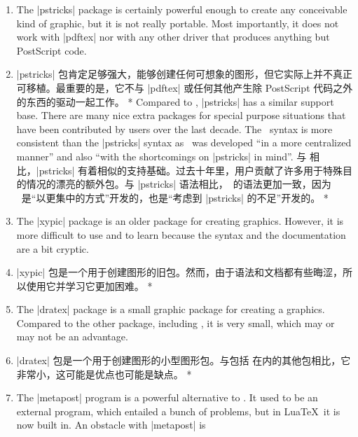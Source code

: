 \begin{paracol}{2}
\begin{enumerate}
        标准的 \LaTeX\ |{picture}| 环境允许你创建简单的图形，但是不太可能做更多。这肯定不是因为 \LaTeX 的设计者缺乏知识或想象力。反而，这是为了 |{picture}| 环境的可移植性而付出的代价：它可以与所有后端驱动一起工作。
    \item The |pstricks| package is certainly powerful enough to create any
        conceivable kind of graphic, but it is not really portable. Most
        importantly, it does not work with |pdftex| nor with any other driver
        that produces anything but PostScript code.
\switchcolumn
\item       
        |pstricks| 包肯定足够强大，能够创建任何可想象的图形，但它实际上并不真正可移植。最重要的是，它不与 |pdftex| 或任何其他产生除 PostScript 代码之外的东西的驱动一起工作。
\switchcolumn[0]*
        Compared to \tikzname, |pstricks| has a similar support base. There
        are many nice extra packages for special purpose situations that have
        been contributed by users over the last decade. The \tikzname\ syntax
        is more consistent than the |pstricks| syntax as \tikzname\ was
        developed ``in a more centralized manner'' and also ``with the
        shortcomings on |pstricks| in mind''.
\switchcolumn
        与 \tikzname 相比，|pstricks| 有着相似的支持基础。过去十年里，用户贡献了许多用于特殊目的情况的漂亮的额外包。与 |pstricks| 语法相比，\tikzname\ 的语法更加一致，因为 \tikzname\ 是“以更集中的方式”开发的，也是“考虑到 |pstricks| 的不足”开发的。
\switchcolumn[0]*	
    \item The |xypic| package is an older package for creating graphics.
        However, it is more difficult to use and to learn because the syntax
        and the documentation are a bit cryptic.
\switchcolumn
\item         |xypic| 包是一个用于创建图形的旧包。然而，由于语法和文档都有些晦涩，所以使用它并学习它更加困难。
\switchcolumn[0]*
    \item The |dratex| package is a small graphic package for creating a
        graphics. Compared to the other package, including \tikzname, it is
        very small, which may or may not be an advantage.
\switchcolumn
\item   |dratex| 包是一个用于创建图形的小型图形包。与包括 \tikzname 在内的其他包相比，它非常小，这可能是优点也可能是缺点。
\switchcolumn[0]*
    \item The |metapost| program is a powerful alternative to \tikzname. It
        used to be an external program, which entailed a bunch of problems,
        but in Lua\TeX\ it is now built in. An obstacle with |metapost| is

\end{enumerate}
\end{paracol}
